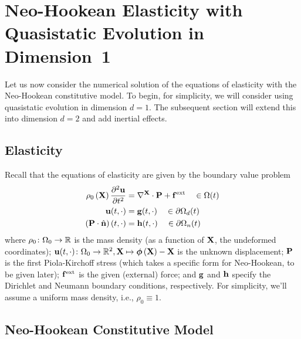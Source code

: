\section{Neo-Hookean Elasticity with Quasistatic Evolution in Dimension~1}

Let us now consider the numerical solution of the equations of elasticity with the Neo-Hookean constitutive model. To begin, for simplicity, we will consider using quasistatic evolution in dimension $d = 1$. The subsequent section will extend this into dimension $d = 2$ and add inertial effects.

\subsection{Elasticity}

Recall that the equations of elasticity are given by the boundary value problem
\begin{subequations}\label{eq:elasticity.i}
\begin{align}
\rho_0 \left( \mathbf{X} \right) \frac{\partial^2 \mathbf{u}}{\partial t^2} & = \nabla^{\mathbf{X}} \cdot \mathbf{P} + \mathbf{f}^{\text{ext}} \quad \in \Omega(t) \\
\mathbf{u}(t,\cdot) & = \mathbf{g}(t,\cdot) \quad \in \partial \Omega_d(t) \\
\left( \mathbf{P} \cdot \hat{\mathbf{n}} \right) (t,\cdot) & = \mathbf{h}(t,\cdot) \quad \in \partial \Omega_n(t)
\end{align}
\end{subequations}
where $\rho_0 \colon \Omega_0 \to \mathbb{R}$ is the mass density (as a function of $\mathbf{X}$, the undeformed coordinates); $\mathbf{u}(t,\cdot) \colon \Omega_0 \to \mathbb{R}^2, \mathbf{X} \mapsto \boldsymbol{\phi} \left( \mathbf{X} \right) - \mathbf{X}$ is the unknown displacement; $\mathbf{P}$ is the first Piola-Kirchoff stress (which takes a specific form for Neo-Hookean, to be given later); $\mathbf{f}^{\text{ext}}$ is the given (external) force; and $\mathbf{g}$ and $\mathbf{h}$ specify the Dirichlet and Neumann boundary conditions, respectively. For simplicity, we'll assume a uniform mass density, i.e., $\rho_0 \equiv 1$.

\subsection{Neo-Hookean Constitutive Model}

